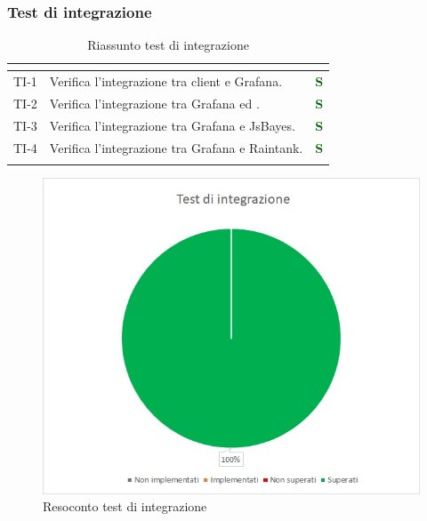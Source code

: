\subsubsection{Test di integrazione}
\normalsize
\renewcommand{\arraystretch}{1}
\begin{longtable}{|C{2.5cm}|C{6.5cm}|C{1.5cm}|}
	\hline
	\textbf{\color{title_text}{Test}} & \textbf{\color{title_text}{Descrizione}} & \textbf{\color{title_text}{Stato}} \\
	\hline
	\endhead
	{TI-1} & Verifica l'integrazione tra client e Grafana. & \textcolor{darkgreen}{\textbf{S}}\\
	\hline
	{TI-2} & Verifica l'integrazione tra Grafana ed . & \textcolor{darkgreen}{\textbf{S}}\\
	\hline
	{TI-3} & Verifica l'integrazione tra Grafana e JsBayes. & \textcolor{darkgreen}{\textbf{S}}\\
	\hline
	{TI-4} & Verifica l'integrazione tra Grafana e Raintank. & \textcolor{darkgreen}{\textbf{S}}\\
	\hline
	\caption{Riassunto test di integrazione}
	\label{tabella:riassunto ta}
\end{longtable}
\renewcommand{\arraystretch}{1}
\begin{figure} [H]
	\centering
	\includegraphics[scale=1]{Img/TI}
	\caption{Resoconto test di integrazione}\label{}
\end{figure}
\newpage

